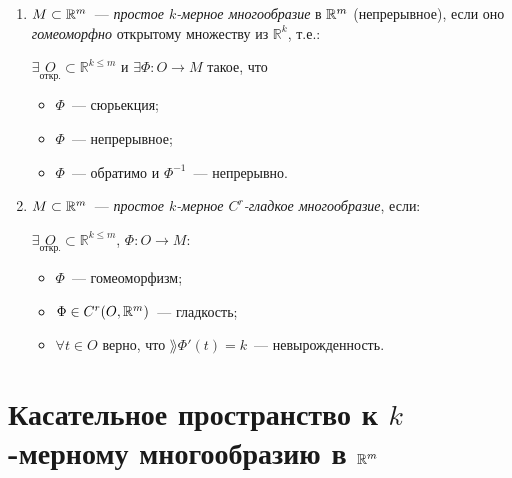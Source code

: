 \documentclass{article}
\begin{document}
        \begin{enumerate}
        
            \item $M \subset \mathbb{R}^m$~--- \textit{простое $k$-мерное многообразие} в $\mathbb{R}^m$ (непрерывное), если оно \textit{гомеоморфно} открытому множеству из $\mathbb{R}^k$, т.е.:
            
                $\exists \underset{\text{откр.}}{O} \subset \mathbb{R}^{k \leqslant m}$ и $\exists \Phi : O \rightarrow M$ такое, что
            
                \begin{itemize}
            
                    \item $\Phi$~--- сюрьекция;
                
                    \item $\Phi$~--- непрерывное;
                
                    \item $\Phi$~--- обратимо и $\Phi^{-1}$~--- непрерывно.
                
                \end{itemize}
            
            \item $M \subset \mathbb{R}^m$~--- \textit{простое $k$-мерное $C^r$-гладкое многообразие}, если:
            
                $\exists \underset{\text{откр.}}{O} \subset \mathbb{R}^{k \leqslant m}$, $\Phi : O \rightarrow M$:
                
                \begin{itemize}
                
                    \item $\Phi$~--- гомеоморфизм;
                    
                    \item $\Phi \in C^r(O, \mathbb{R}^m)$~--- гладкость;
                    
                    \item $\forall t \in O$ верно, что $\rang \Phi'(t) = k$~--- невырожденность.
                    
                \end{itemize}
        
        \end{enumerate}
    
    \newpage
    
    \section{Касательное пространство к $k$-мерному многообразию в $\mathbb{R}^m$}
    
\end{document}
